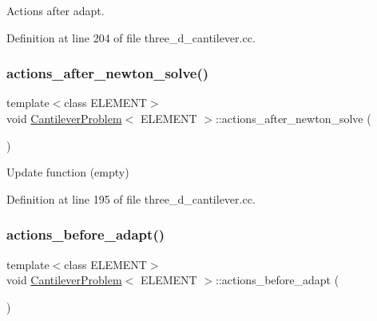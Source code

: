 Actions after adapt. 



Definition at line 204 of file three\+\_\+d\+\_\+cantilever.\+cc.

\mbox{\label{classCantileverProblem_a4a70a4328d287aaa15c7811562122013}} 
\subsubsection{\texorpdfstring{actions\+\_\+after\+\_\+newton\+\_\+solve()}{actions\_after\_newton\_solve()}}
{\footnotesize\ttfamily template$<$class E\+L\+E\+M\+E\+NT$>$ \\
void \hyperlink{classCantileverProblem}{Cantilever\+Problem}$<$ E\+L\+E\+M\+E\+NT $>$\+::actions\+\_\+after\+\_\+newton\+\_\+solve (\begin{DoxyParamCaption}{ }\end{DoxyParamCaption})\hspace{0.3cm}{\ttfamily [inline]}}



Update function (empty) 



Definition at line 195 of file three\+\_\+d\+\_\+cantilever.\+cc.

\mbox{\label{classCantileverProblem_a50f8964219c507562945655e0ed5fc23}} 
\subsubsection{\texorpdfstring{actions\+\_\+before\+\_\+adapt()}{actions\_before\_adapt()}}
{\footnotesize\ttfamily template$<$class E\+L\+E\+M\+E\+NT$>$ \\
void \hyperlink{classCantileverProblem}{Cantilever\+Problem}$<$ E\+L\+E\+M\+E\+NT $>$\+::actions\+\_\+before\+\_\+adapt (\begin{DoxyParamCaption}{ }\end{DoxyParamCaption})\hspace{0.3cm}{\ttfamily [inline]}}



